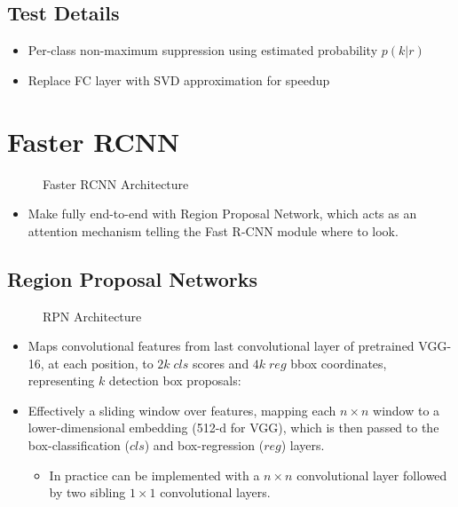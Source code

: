 \subsection*{Test Details}
\begin{itemize}
\item Per-class non-maximum suppression using estimated probability $p(k | r)$
\item Replace FC layer with SVD approximation for speedup 
\end{itemize}


\section*{Faster RCNN \cite{faster_rcnn}}

\begin{figure}[H]
    \caption{\label{fig:faster_rcnn_arch} Faster RCNN Architecture}
\end{figure}

\begin{itemize}
\item Make fully end-to-end with Region Proposal Network, which acts as an attention mechanism telling the Fast R-CNN module where to look.
\end{itemize}

\subsection*{Region Proposal Networks}
\begin{figure}[H]
    \caption{\label{fig:faster_rcnn_rpn} RPN Architecture}
\end{figure}
\begin{itemize}
\item Maps convolutional features from last convolutional layer of pretrained VGG-16, at each position, to $2k \; cls$ scores and $4k \; reg$ bbox coordinates, representing $k$ detection box proposals:
	
\item Effectively a sliding window over features, mapping each $n \times n$ window to a lower-dimensional embedding (512-d for VGG), which is then passed to the box-classification ($cls$) and box-regression ($reg$) layers.
	\begin{itemize}
	\item In practice can be implemented with a $n \times n$ convolutional layer followed by two sibling $1 \times 1$ convolutional layers.
	\end{itemize}
\end{itemize}

